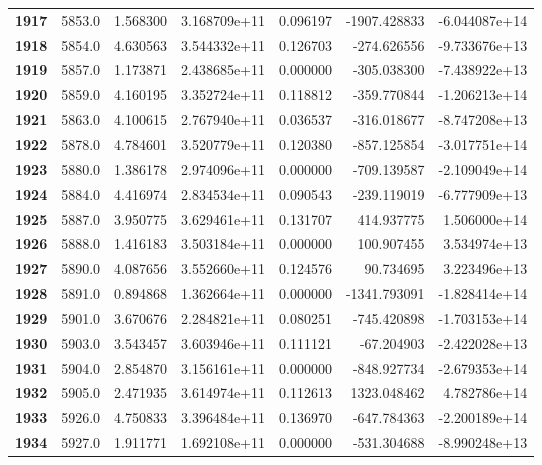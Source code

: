 \documentclass{report}[12pt]
\begin{document}
\begin{center}
\begin{tabular}{lrrrrrr}
\textbf{1917} &         5853.0 &   1.568300 &  3.168709e+11 &    0.096197 & -1907.428833 & -6.044087e+14 \\
\textbf{1918} &         5854.0 &   4.630563 &  3.544332e+11 &    0.126703 &  -274.626556 & -9.733676e+13 \\
\textbf{1919} &         5857.0 &   1.173871 &  2.438685e+11 &    0.000000 &  -305.038300 & -7.438922e+13 \\
\textbf{1920} &         5859.0 &   4.160195 &  3.352724e+11 &    0.118812 &  -359.770844 & -1.206213e+14 \\
\textbf{1921} &         5863.0 &   4.100615 &  2.767940e+11 &    0.036537 &  -316.018677 & -8.747208e+13 \\
\textbf{1922} &         5878.0 &   4.784601 &  3.520779e+11 &    0.120380 &  -857.125854 & -3.017751e+14 \\
\textbf{1923} &         5880.0 &   1.386178 &  2.974096e+11 &    0.000000 &  -709.139587 & -2.109049e+14 \\
\textbf{1924} &         5884.0 &   4.416974 &  2.834534e+11 &    0.090543 &  -239.119019 & -6.777909e+13 \\
\textbf{1925} &         5887.0 &   3.950775 &  3.629461e+11 &    0.131707 &   414.937775 &  1.506000e+14 \\
\textbf{1926} &         5888.0 &   1.416183 &  3.503184e+11 &    0.000000 &   100.907455 &  3.534974e+13 \\
\textbf{1927} &         5890.0 &   4.087656 &  3.552660e+11 &    0.124576 &    90.734695 &  3.223496e+13 \\
\textbf{1928} &         5891.0 &   0.894868 &  1.362664e+11 &    0.000000 & -1341.793091 & -1.828414e+14 \\
\textbf{1929} &         5901.0 &   3.670676 &  2.284821e+11 &    0.080251 &  -745.420898 & -1.703153e+14 \\
\textbf{1930} &         5903.0 &   3.543457 &  3.603946e+11 &    0.111121 &   -67.204903 & -2.422028e+13 \\
\textbf{1931} &         5904.0 &   2.854870 &  3.156161e+11 &    0.000000 &  -848.927734 & -2.679353e+14 \\
\textbf{1932} &         5905.0 &   2.471935 &  3.614974e+11 &    0.112613 &  1323.048462 &  4.782786e+14 \\
\textbf{1933} &         5926.0 &   4.750833 &  3.396484e+11 &    0.136970 &  -647.784363 & -2.200189e+14 \\
\textbf{1934} &         5927.0 &   1.911771 &  1.692108e+11 &    0.000000 &  -531.304688 & -8.990248e+13 \\

\end{tabular}
\end{center}
\end{document}
